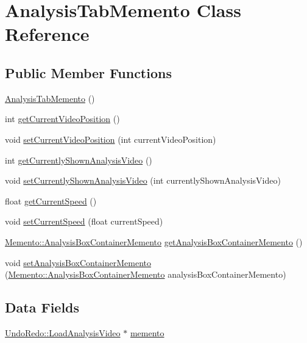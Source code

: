 \hypertarget{classMemento_1_1AnalysisTabMemento}{}\section{Analysis\+Tab\+Memento Class Reference}
\label{classMemento_1_1AnalysisTabMemento}
\subsection*{Public Member Functions}
\begin{DoxyCompactItemize}
\item 
\hyperlink{classMemento_1_1AnalysisTabMemento_a035f84d6066cdb7d8a475da4710d2e67}{Analysis\+Tab\+Memento} ()
\item 
int \hyperlink{classMemento_1_1AnalysisTabMemento_af7babc742dcea9250c73c408b2cfacf2}{get\+Current\+Video\+Position} ()
\item 
void \hyperlink{classMemento_1_1AnalysisTabMemento_a66ff926aa567b15381b5906cd65c6b7d}{set\+Current\+Video\+Position} (int current\+Video\+Position)
\item 
int \hyperlink{classMemento_1_1AnalysisTabMemento_a687a0fc92408cf713058eaf23abc22f3}{get\+Currently\+Shown\+Analysis\+Video} ()
\item 
void \hyperlink{classMemento_1_1AnalysisTabMemento_a1d76537f6e47c09e47bf15eefd26feff}{set\+Currently\+Shown\+Analysis\+Video} (int currently\+Shown\+Analysis\+Video)
\item 
float \hyperlink{classMemento_1_1AnalysisTabMemento_a4c7df241ee5989199664bfc3b336d228}{get\+Current\+Speed} ()
\item 
void \hyperlink{classMemento_1_1AnalysisTabMemento_aa99f3e18fe8363d1333c1ddedfa12084}{set\+Current\+Speed} (float current\+Speed)
\item 
\hyperlink{classMemento_1_1AnalysisBoxContainerMemento}{Memento\+::\+Analysis\+Box\+Container\+Memento} \hyperlink{classMemento_1_1AnalysisTabMemento_a1882d53a845bc483ee4974f633026043}{get\+Analysis\+Box\+Container\+Memento} ()
\item 
void \hyperlink{classMemento_1_1AnalysisTabMemento_aca56db151b2ff66e743215ac8bc5b942}{set\+Analysis\+Box\+Container\+Memento} (\hyperlink{classMemento_1_1AnalysisBoxContainerMemento}{Memento\+::\+Analysis\+Box\+Container\+Memento} analysis\+Box\+Container\+Memento)
\end{DoxyCompactItemize}
\subsection*{Data Fields}
\begin{DoxyCompactItemize}
\item 
\hyperlink{classUndoRedo_1_1LoadAnalysisVideo}{Undo\+Redo\+::\+Load\+Analysis\+Video} $\ast$ \hyperlink{classMemento_1_1AnalysisTabMemento_a731f7e64bd421edb4c6b06e41f3c4c93}{memento}
\end{DoxyCompactItemize}


